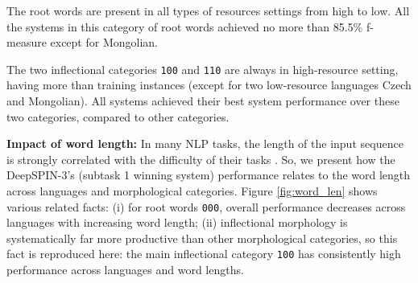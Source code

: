 \documentclass[11pt]{article}
\begin{document}
The root words are present in all types of resources settings from high to low. All the systems in this category of root words achieved no more than 85.5\% f-measure except for Mongolian. 

The two inflectional categories \texttt{100} and \texttt{110} are always in high-resource setting, having more than  training instances (except for two low-resource languages Czech and Mongolian). All systems achieved their best system performance over these two categories, compared to other categories.

\vspace{1em} \noindent \textbf{Impact of word length:} 
In many NLP tasks, the length of the input sequence is strongly correlated with the difficulty of their tasks \cite{yin2017comparative,wu2018phrase}. So, we present how the DeepSPIN-3's (subtask 1 winning system) performance relates to the word length across languages and morphological categories. Figure \ref{fig:word_len} shows various related facts: (i) for root words \texttt{000}, overall performance decreases across languages with increasing word length; (ii) inflectional morphology is systematically far more productive than other morphological categories, so this fact is reproduced here: the main inflectional category \texttt{100} has consistently high performance across languages and word lengths. 
\end{document}
